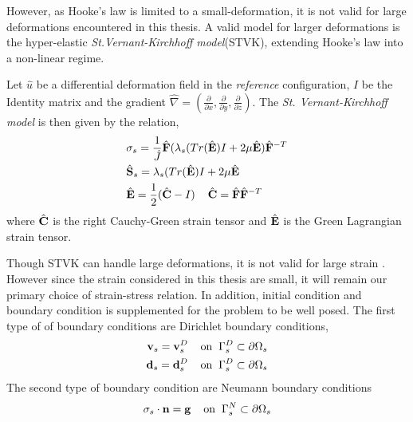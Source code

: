 However, as Hooke's law is limited to a small-deformation, it is not valid for large deformations encountered in this thesis. A valid model for larger deformations is the hyper-elastic \textit{St.\@ Vernant-Kirchhoff model}(STVK), 
extending Hooke's law into a non-linear regime.
 \begin{defn}
Let $\hat{u}$ be a differential deformation field in the \textit{reference} configuration, $I$ be the Identity matrix and the gradient $\hat{\nabla} = (\frac{\partial}{\partial x}, \frac{\partial}{\partial y}, \frac{\partial}{\partial z}) $. The \textit{St. Vernant-Kirchhoff model} is then given by the relation,
\begin{align*}
&\sigma_s = \frac{1}{\hat{J}} \hat{\mathbf{F}}(\lambda_s(Tr(\hat{\mathbf{E}}) I + 2 \mu \hat{\mathbf{E}})\hat{\mathbf{F}}^{-T} \\
&\hat{\mathbf{S}}_s = \lambda_s(Tr(\hat{\mathbf{E}}) I + 2 \mu \hat{\mathbf{E}} \\
&\hat{\mathbf{E}} = \frac{1}{2}(\hat{\mathbf{C}} - I ) \hspace{4mm} \hat{\mathbf{C}} = \hat{\mathbf{F}}\hat{\mathbf{F}}^{-T}
\end{align*} 
where $\hat{\mathbf{C}}$ is the right Cauchy-Green strain tensor and $\hat{\mathbf{E}}$ is the Green Lagrangian strain tensor.
\end{defn}
  
Though STVK can handle large deformations, it is not valid for large strain \cite{Razzaq2010}. However since the strain considered in this thesis are small, it will remain our primary choice of strain-stress relation. In addition, initial condition and boundary condition is supplemented for the problem to be well posed. The first type of of boundary conditions are Dirichlet boundary conditions, 
\begin{align}
\mathbf{v}_s = \mathbf{v}_s^D 
\hspace{4mm} \text{on} \hspace{2mm} \Gamma_s^D \subset \partial \Omega_s \\
\mathbf{d}_s = \mathbf{d}_s^D 
\hspace{4mm} \text{on} \hspace{2mm} \Gamma_s^D \subset \partial \Omega_s \\
\end{align}
The second type of boundary condition are Neumann boundary conditions
\begin{align}
\sigma_s \cdot \mathbf{n} = \mathbf{g}  
\hspace{4mm} \text{on} \hspace{2mm} \Gamma_s^N \subset \partial \Omega_s 
\end{align}
 \newpage
